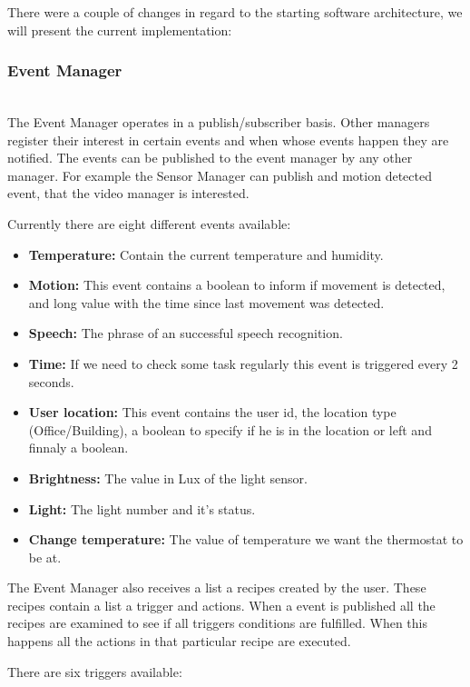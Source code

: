 There were a couple of changes in regard to the starting software architecture, we will present the current implementation:

\subsubsection{Event Manager}\mbox{}\\

The Event Manager  operates in a publish/subscriber basis. Other managers register their interest in certain events and when whose events happen they are notified. The events can be published to the event manager by any other manager. For example the Sensor Manager can publish and motion detected event, that the video manager is interested.

Currently there are eight different events available:

\begin{itemize}
  \item \textbf{Temperature:} Contain the current temperature and humidity.
  \item \textbf{Motion:} This event contains a boolean to inform if movement is detected, and long value with the time since last movement was detected.
  \item \textbf{Speech:} The phrase of an successful speech recognition.  
  \item \textbf{Time:} If we need to check some task regularly this event is triggered every 2 seconds.  
  \item \textbf{User location:} This event contains the user id, the location type (Office/Building), a boolean to specify if he is in the location or left and finnaly a boolean.
  \item \textbf{Brightness:} The value in Lux of the light sensor.  
  \item \textbf{Light:} The light number and it's status. 
  \item \textbf{Change temperature:} The value of temperature we want the thermostat to be at. 
  
\end{itemize}


The Event Manager also receives a list a recipes created by the user. These recipes contain a list a trigger and actions. When a event is published all the recipes are examined to see if all triggers conditions are fulfilled. When this happens all the actions in that particular recipe are executed.

There are six triggers available:

